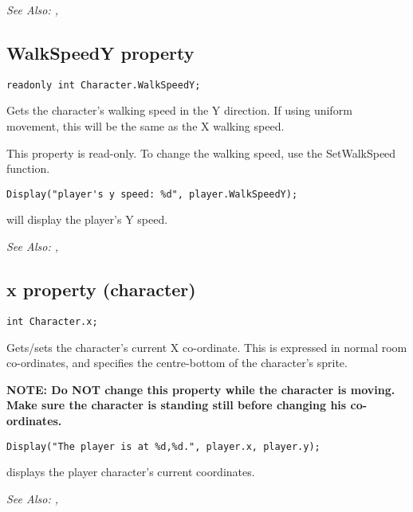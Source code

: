 \it{See Also:} ,


\subsection{WalkSpeedY property}\label{Character.WalkSpeedY}%

\begin{verbatim}
readonly int Character.WalkSpeedY;
\end{verbatim}

Gets the character's walking speed in the Y direction. If using uniform movement,
this will be the same as the X walking speed.

This property is read-only. To change the walking speed, use the SetWalkSpeed function.

\begin{verbatim}
Display("player's y speed: %d", player.WalkSpeedY);
\end{verbatim}
will display the player's Y speed.

\it{See Also:} ,


\subsection{x property (character)}\label{Character.x}%

\begin{verbatim}
int Character.x;
\end{verbatim}

Gets/sets the character's current X co-ordinate. This is expressed in normal room
co-ordinates, and specifies the centre-bottom of the character's sprite.

\bf{NOTE:} Do \bf{NOT} change this property while the character is moving. Make
sure the character is standing still before changing his co-ordinates.

\begin{verbatim}
Display("The player is at %d,%d.", player.x, player.y);
\end{verbatim}
displays the player character's current coordinates.

\it{See Also:} ,


